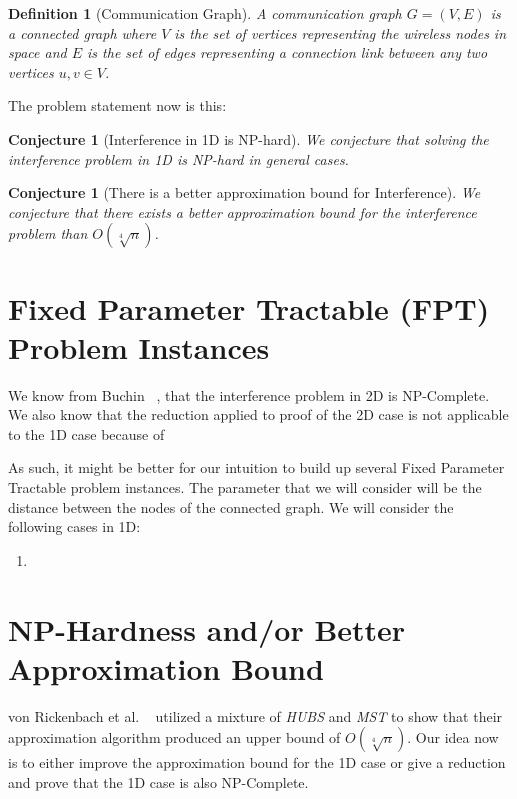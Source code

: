 \documentclass{article}
\newtheorem{conjecture}[theorem]{Conjecture}
\newtheorem{definition}[theorem]{Definition}
\begin{document}
\begin{definition}[Communication Graph]
	A communication graph $G = (V, E)$ is a connected graph where $V$ is the set of vertices representing the wireless nodes in space and $E$ is the set of edges representing a connection link between any two vertices $u, v \in V$.
\end{definition}

The problem statement now is this:

\begin{conjecture}[Interference in 1D is NP-hard]
	We conjecture that solving the interference problem in 1D is NP-hard in general cases. 
\end{conjecture}

\begin{conjecture}[There is a better approximation bound for Interference]
	We conjecture that there exists a better approximation bound for the interference problem than $O(\sqrt[4]{n})$.
\end{conjecture}


\section{Fixed Parameter Tractable (FPT) Problem Instances}
We know from Buchin ~\cite{buchin2011minimizing}, that the interference problem in 2D is NP-Complete. We also know that the reduction applied to proof of the 2D case is not applicable to the 1D case because of %

As such, it might be better for our intuition to build up several Fixed Parameter Tractable problem instances. The parameter that we will consider will be the distance between the nodes of the connected graph. We will consider the following cases in 1D:

\begin{enumerate}
	\item 
\end{enumerate}

\section{NP-Hardness and/or Better Approximation Bound}
von Rickenbach et al. ~\cite{1420165} utilized a mixture of \textit{HUBS} and \textit{MST} to show that their approximation algorithm produced an upper bound of $O(\sqrt[4]{n})$. Our idea now is to either improve the approximation bound for the 1D case or give a reduction and prove that the 1D case is also NP-Complete.
\end{document}
